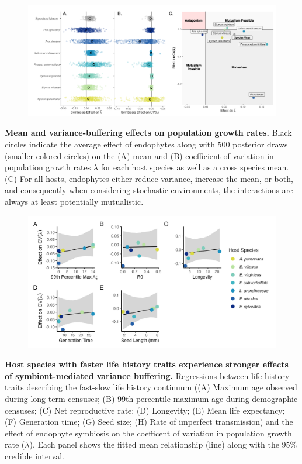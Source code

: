 \documentclass[12pt]{article}
\begin{document}
\begin{figure}
	\centering
	\includegraphics[width=\linewidth]{StochDemo_fig2.png}
\end{figure}
 \textbf{Mean and variance-buffering effects on population growth rates.} Black circles indicate the average effect of endophytes along with 500 posterior draws (smaller colored circles) on the (A) mean and (B) coefficient of variation in population growth rates $\lambda$ for each host species as well as a cross species mean. (C) For all hosts, endophytes either reduce variance, increase the mean, or both, and consequently when considering stochastic environments, the interactions are always at least potentially mutualistic.
\newpage

\begin{figure}
	\centering
	\includegraphics[width=\linewidth]{StochDemo_fig3.png}
\end{figure}
 \textbf{Host species with faster life history traits experience stronger effects of symbiont-mediated variance buffering.} Regressions between life history traits describing the fast-slow life history continuum ((A) Maximum age observed during long term censuses; (B) 99th percentile maximum age during demographic censuses; (C) Net reproductive rate; (D) Longevity; (E) Mean life expectancy; (F) Generation time; (G) Seed size; (H) Rate of imperfect transmission) and the effect of endophyte symbiosis on the coefficent of variation in population growth rate ($\lambda$). Each panel shows the fitted mean relationship (line) along with the 95\% credible interval.
\newpage
\end{document}
